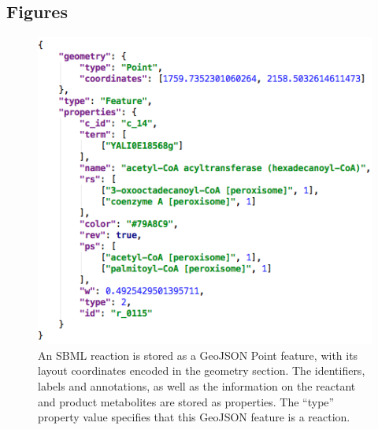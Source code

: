 \documentclass{bmcart}
\begin{document}
\begin{backmatter}

\section*{Figures}

\begin{figure}[h!]
\includegraphics[scale=0.5]{figure2.png}
  \caption{
  \label{geojson}
      An SBML reaction is stored as a GeoJSON Point feature, with its layout coordinates encoded in the geometry section. The identifiers, labels and annotations, as well as the information on the reactant and product metabolites are stored as properties. The ``type'' property value specifies that this GeoJSON feature is a reaction.}
      \end{figure}
      

\end{backmatter}
\end{document}
